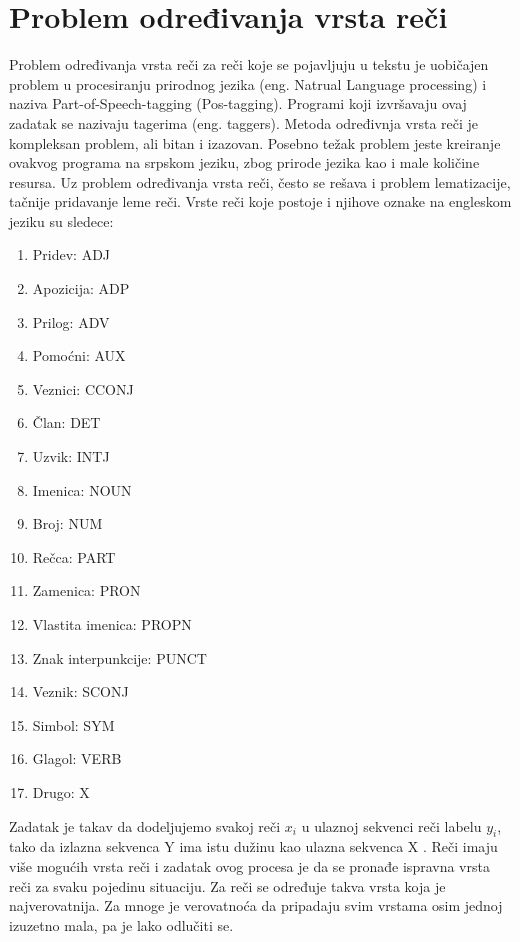 \documentclass[12pt,oneside]{memoir}
\begin{document}
\section{Problem određivanja vrsta reči}

Problem određivanja vrsta reči za reči koje se pojavljuju u tekstu je uobičajen problem u procesiranju prirodnog jezika (eng. Natrual Language processing) i naziva Part-of-Speech-tagging (Pos-tagging).  Programi koji izvršavaju ovaj zadatak se nazivaju tagerima (eng. taggers).  Metoda određivnja vrsta reči je kompleksan problem, ali bitan i izazovan. Posebno težak problem jeste kreiranje ovakvog programa na srpskom jeziku, zbog prirode jezika kao i male količine resursa.  Uz problem određivanja vrsta reči, često se rešava i problem lematizacije, tačnije pridavanje leme reči. Vrste reči koje postoje i njihove oznake na engleskom jeziku su sledece:

\begin{enumerate}
\item Pridev: ADJ
\item Apozicija: ADP
\item Prilog: ADV
\item Pomoćni: AUX
\item Veznici: CCONJ
\item Član: DET
\item Uzvik: INTJ
\item Imenica: NOUN
\item Broj: NUM
\item Rečca: PART
\item Zamenica: PRON
\item Vlastita imenica: PROPN
\item Znak interpunkcije: PUNCT
\item Veznik: SCONJ
\item Simbol: SYM
\item Glagol: VERB
\item Drugo: X
\end{enumerate}

Zadatak je takav da dodeljujemo svakoj reči $x_i$ u ulaznoj sekvenci reči labelu $y_i$, tako da izlazna sekvenca Y ima istu dužinu kao ulazna sekvenca X \cite{postagging}. Reči imaju više mogućih vrsta reči i zadatak ovog procesa je da se pronađe ispravna vrsta reči za svaku pojedinu situaciju. Za reči se određuje takva vrsta koja je najverovatnija. Za mnoge je verovatnoća da pripadaju svim vrstama osim jednoj izuzetno mala, pa je lako odlučiti se.
\end{document}
